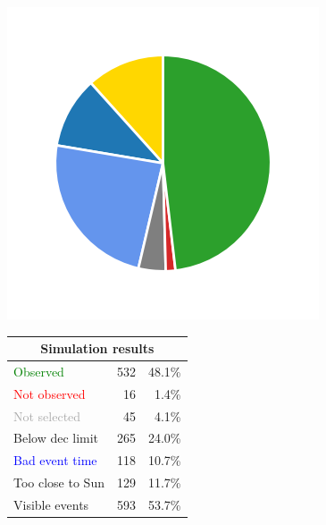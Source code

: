 \begin{colsection}
\begin{colsection}
\begin{figure}[p]
\begin{center}
\begin{minipage}[t]{0.2\textwidth}\vspace{10pt}
\includegraphics[width=\linewidth]{images/gw_sims/1n4_pie.png}
\end{minipage}
%
\begin{minipage}[t]{0.37\textwidth}\vspace{0pt}
\begin{tabular}{lrr}
\multicolumn{3}{c}{\textbf{Simulation results}} \\
\midrule
\textcolor{Green}{Observed} & 532 & 48.1\% \\
\textcolor{Red}{Not observed} & 16 & 1.4\% \\
\textcolor{darkgray}{Not selected} & 45 & 4.1\% \\
\textcolor{NavyBlue}{Below dec limit} & 265 & 24.0\% \\
\textcolor{Blue}{Bad event time} & 118 & 10.7\% \\
\textcolor{BurntOrange}{Too close to Sun} & 129 & 11.7\% \\
\midrule
Visible events & 593 &  53.7\% \\
\end{tabular}
\end{minipage}
%
\begin{minipage}[t]{0.35\textwidth}\vspace{0pt}

\end{minipage}
\end{center}
\end{figure}
\end{colsection}
\end{colsection}
